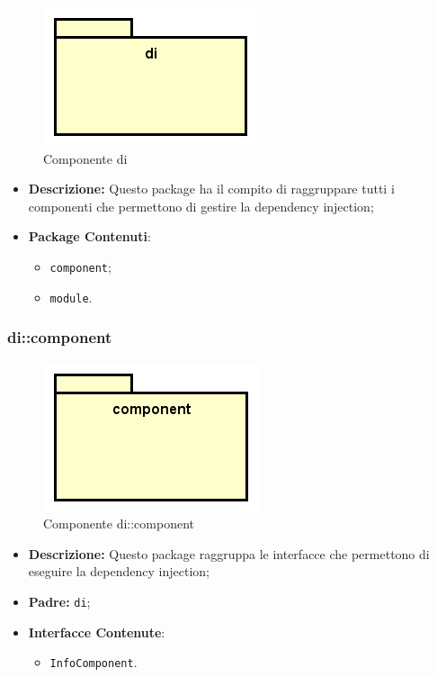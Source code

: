 \documentclass[../DefinizioneDiProdotto.tex]{subfiles}
\begin{document}
\begin{figure}[H]
	\centering
	\includegraphics[width=\maxwidth]{img/package/di.png}
	\caption{Componente di}\label{fig:di} 
\end{figure}
\begin{itemize}
	\item \textbf{Descrizione:} Questo package ha il compito di raggruppare tutti i componenti che permettono di gestire la dependency injection;
	\item \textbf{Package Contenuti}:
	\begin{itemize}
		\item \texttt{component};
		
		\item \texttt{module}.
		
	\end{itemize}
\end{itemize}

\subsubsection{di::\-component}

\begin{figure}[H]
	\centering
	\includegraphics[width=\maxwidth]{img/package/component.png}
	\caption{Componente di::\-component}\label{fig:di::component} 
\end{figure}
\begin{itemize}
	\item \textbf{Descrizione:} Questo package raggruppa le interfacce che permettono di eseguire la dependency injection;
	\item \textbf{Padre:} \texttt{di};
	\item \textbf{Interfacce Contenute}:
	\begin{itemize}
		\item \texttt{InfoComponent}.
		
	\end{itemize}
\end{itemize}
\end{document}
